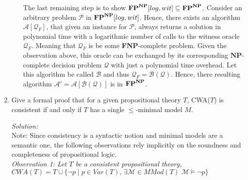 \documentclass[11pt,a4paper]{article}
\newcommand{\NP}{\ensuremath{\mathbf{NP}}\xspace}
\newcommand{\FPol}{\ensuremath{\protect\mathbf{FP}}\xspace}
\newcommand{\FPNP}{\ensuremath{\FPol^{\NP}}\xspace}
\newcommand{\FPNPlogwit}{\ensuremath{\FPol^{\NP}[log, wit]}\xspace}
\begin{document}
\begin{enumerate}
\begin{enumerate}[(a)]
 The last remaining step is to show $\FPNPlogwit  \subseteq  \FPNP$. Consider an arbitrary problem $\mathcal{P}$ in \FPNPlogwit . Hence, there exists an algorithm $\mathcal{A}[\mathcal{Q}_F]$, that given an instance for $\mathcal{P}$, always returns a solution in polynomial time with a logarithmic number of calls to the witness oracle $\mathcal{Q}_F$. Meaning that $\mathcal{Q}_F$ is be some \textbf{FNP}-complete problem. Given the observation above, this oracle can be exchanged by its corresponding \NP-complete decision problem $\mathcal{Q}$ with just a polynomial time overhead. Let this algorithm be called $\mathcal{B}$ and thus $\mathcal{Q}_F= \mathcal{B}(\mathcal{Q})$. Hence, there resulting algorithm $\mathcal{A}'=\mathcal{A}[\mathcal{B}(\mathcal{Q})]$ is in \FPNP. \\
 

\end{enumerate}
            
            

\newpage
            
\item Give a formal proof that for a given propositional theory $T$,
CWA($T$) is consistent if and only if $T$ has a single  $\leq$-minimal model $M$. 

\bigskip

\emph{Solution:}\\

Note: Since consistency is a syntactic notion and minimal models are a semantic one, the following observations rely implicitly on the soundness and completeness of propositional logic.\\

\emph{Observation 1: Let $T$ be a consistent propositional theory, $\mathit{CWA}(T)= T \cup \{ \neg p \mid p \in \mathit{Var}(T) , \,\exists \mathcal{M} \in \mathit{MMod}(T) \; \mathcal{M} \models \neg p \}$ }



\end{enumerate}
\end{document}
